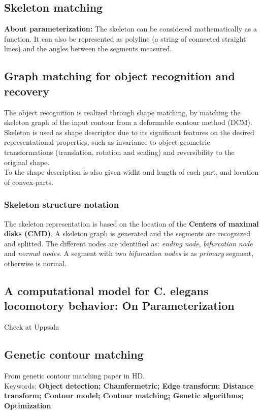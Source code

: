 \documentclass{article}
\begin{document}
\subsection{Skeleton matching}
\textbf{About parameterization: } The skeleton can be considered mathematically as a function.
It can also be represented as polyline (a string of connected straight lines) and the angles
between the segments measured. 

\subsection{Graph matching for object recognition and recovery}
The object recognition is realized through shape matching, by matching the skeleton graph of
the input contour from a deformable contour method (DCM).
Skeleton is used as shape descriptor due to its significant features on the desired representational
properties, such as invariance to object geometric transformations (translation, rotation and scaling)
and reversibility to the original shape.\\
To the shape description is also given widht and length of each part, and location
of convex-parts.

\subsubsection*{Skeleton structure notation}
The skeleton representation is based on the location of the \textbf{Centers of maximal
disks (CMD)}. A skeleton graph is generated and the segments are recognized and splitted.
The different nodes are identified as: \emph{ending node}, \emph{bifurcation node} and
\emph{normal nodes}. A segment with two \emph{bifurcation nodes} is as \emph{primary} segment,
otherwise is normal.\\


\subsection{ A computational model for C. elegans locomotory behavior: On Parameterization}
Check at Uppsala


\subsection{Genetic contour matching}
From genetic contour matching paper in HD.\\


Keywords:\textbf{ Object detection; Chamfermetric; Edge transform; Distance transform; Contour model; Contour matching; Genetic algorithms;
Optimization}\\
\end{document}
